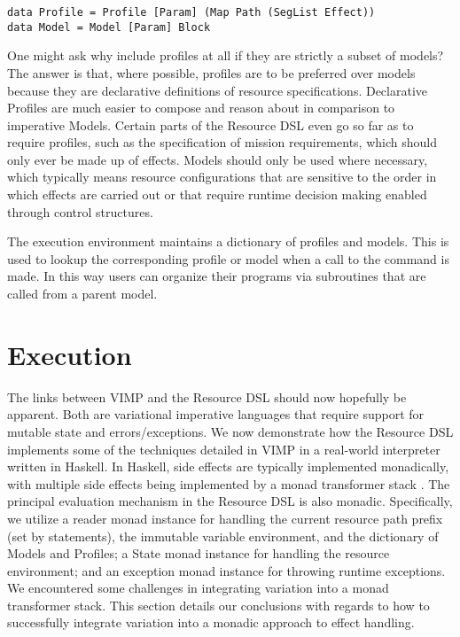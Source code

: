 \documentclass[12pt,oneside]{book}
\begin{document}
\begin{lstlisting}
data Profile = Profile [Param] (Map Path (SegList Effect))
data Model = Model [Param] Block
\end{lstlisting}

One might ask why include profiles at all if they are strictly a subset of models? The answer is that, where possible, profiles
are to be preferred over models because they are declarative definitions of resource specifications. Declarative Profiles
are much easier to compose and reason about in comparison to imperative Models. Certain parts of the Resource DSL
even go so far as to require profiles, such as the specification of mission requirements, which should only ever be made up
of  effects. Models should only be used where necessary, which typically means resource configurations that are
sensitive to the order in which effects are carried out or that require runtime decision making enabled through control structures.

The execution environment maintains a dictionary of profiles and models. This is used to lookup the corresponding profile or
model when a call to the  command is made. In this way users can organize their programs via subroutines that are
called from a parent model.


\section{Execution} 

The links between VIMP and the Resource DSL should now hopefully be apparent. Both are variational imperative
languages that require support for mutable state and errors/exceptions. We now demonstrate how the Resource
DSL implements some of the techniques detailed in VIMP in a real-world interpreter written in Haskell. In Haskell,
side effects are typically implemented monadically, with multiple side effects being implemented by a monad transformer
stack \cite{liang1995monad}. The principal evaluation mechanism in the Resource DSL is also monadic. Specifically,
we utilize a reader monad instance for handling the current resource path prefix (set by  statements),
the immutable variable environment, and the dictionary of Models and Profiles; a State monad instance for handling
the resource environment; and an exception monad instance for throwing runtime exceptions.
We encountered
some challenges in integrating variation into a monad transformer stack. This section details our conclusions with regards to
how to successfully integrate variation into a monadic approach to effect handling.
\end{document}
